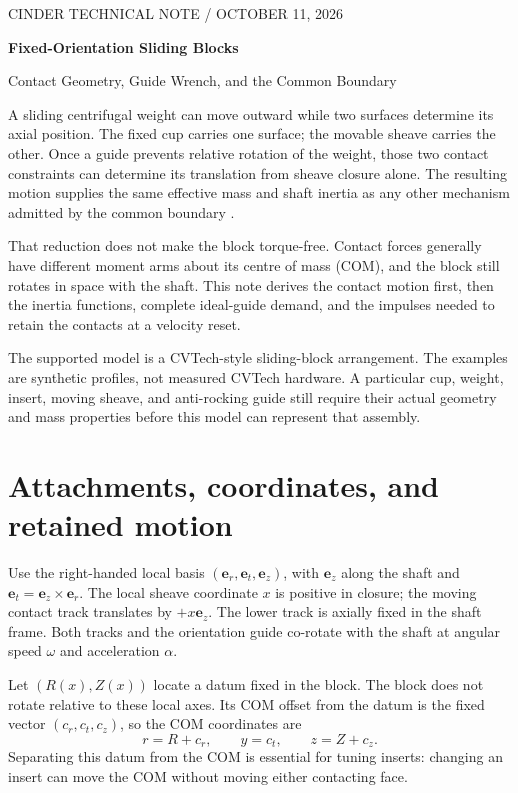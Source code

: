 \documentclass[11pt,letterpaper]{article}
\numberwithin{equation}{section}
\newcommand{\er}{\bm e_r}\newcommand{\et}{\bm e_t}\newcommand{\ez}{\bm e_z}
\begin{document}
\begin{center}
{\small CINDER TECHNICAL NOTE / OCTOBER 11, 2026}\par\vspace{.7em}
{\LARGE\bfseries Fixed-Orientation Sliding Blocks}\par\vspace{.4em}
{\large Contact Geometry, Guide Wrench, and the Common Boundary}
\end{center}

A sliding centrifugal weight can move outward while two surfaces determine its
axial position. The fixed cup carries one surface; the movable sheave carries
the other. Once a guide prevents relative rotation of the weight, those two
contact constraints can determine its translation from sheave closure alone.
The resulting motion supplies the same effective mass and shaft inertia as
any other mechanism admitted by the common boundary \cite{common}.

That reduction does not make the block torque-free. Contact forces generally
have different moment arms about its centre of mass (COM), and the block still
rotates in space with the shaft. This note derives the contact motion first,
then the inertia functions, complete ideal-guide demand, and the impulses
needed to retain the contacts at a velocity reset.

The supported model is a CVTech-style sliding-block arrangement. The examples
are synthetic profiles, not measured CVTech hardware. A particular cup, weight,
insert, moving sheave, and anti-rocking guide still require their actual
geometry and mass properties before this model can represent that assembly.

\hypertarget{contents}{}\setcounter{tocdepth}{1}\tableofcontents
\clearpage
\section{Attachments, coordinates, and retained motion}

Use the right-handed local basis $(\er,\et,\ez)$, with $\ez$ along the shaft
and $\et=\ez\times\er$. The local sheave coordinate $x$ is positive in closure;
the moving contact track translates by $+x\ez$. The lower track is axially
fixed in the shaft frame. Both tracks and the orientation guide co-rotate
with the shaft at angular speed $\omega$ and acceleration $\alpha$.

Let $(R(x),Z(x))$ locate a datum fixed in the block. The block does not rotate
relative to these local axes. Its COM offset from the datum is the fixed
vector $(c_r,c_t,c_z)$, so the COM coordinates are
\begin{equation}
 r=R+c_r,\qquad y=c_t,\qquad z=Z+c_z.
\end{equation}
Separating this datum from the COM is essential for tuning inserts: changing
an insert can move the COM without moving either contacting face.
\end{document}
